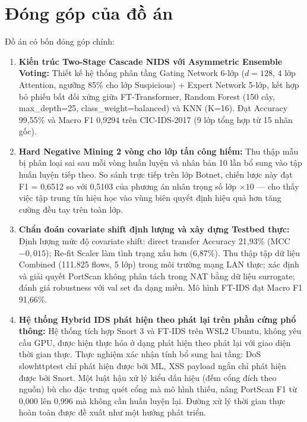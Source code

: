 \documentclass[../DoAn.tex]{subfiles}
\begin{document}
\section{Đóng góp của đồ án}
\label{sec:dg}

Đồ án có bốn đóng góp chính:

\begin{enumerate}
    \item \textbf{Kiến trúc Two-Stage Cascade NIDS với Asymmetric Ensemble Voting:} Thiết kế hệ thống phân tầng Gating Network 6-lớp ($d=128$, 4 lớp Attention, ngưỡng 85\% cho lớp Suspicious) + Expert Network 5-lớp, kết hợp bỏ phiếu bất đối xứng giữa FT-Transformer, Random Forest (150 cây, max\_depth=25, class\_weight=balanced) và KNN (K=16). Đạt Accuracy 99,55\% và Macro F1 0,9294 trên CIC-IDS-2017 (9 lớp tổng hợp từ 15 nhãn gốc).

    \item \textbf{Hard Negative Mining 2 vòng cho lớp tấn công hiếm:} Thu thập mẫu bị phân loại sai sau mỗi vòng huấn luyện và nhân bản 10 lần bổ sung vào tập huấn luyện tiếp theo. So sánh trực tiếp trên lớp Botnet, chiến lược này đạt F1 = 0,6512 so với 0,5103 của phương án nhân trọng số lớp $\times 10$ --- cho thấy việc tập trung tín hiệu học vào vùng biên quyết định hiệu quả hơn tăng cường đều tay trên toàn lớp.

    \item \textbf{Chẩn đoán covariate shift định lượng và xây dựng Testbed thực:} Định lượng mức độ covariate shift: direct transfer Accuracy 21,93\% (MCC $-0{,}015$); Re-fit Scaler làm tình trạng xấu hơn (6,87\%). Thu thập tập dữ liệu Combined (111.825 flows, 5 lớp) trong môi trường mạng LAN thực; xác định và giải quyết PortScan không phân tách trong NAT bằng dữ liệu surrogate; đánh giá robustness với val set đa dạng miền. Mô hình FT-IDS đạt Macro F1 91,66\%.

    \item \textbf{Hệ thống Hybrid IDS phát hiện theo phát lại trên phần cứng phổ thông:} Hệ thống tích hợp Snort 3 và FT-IDS trên WSL2 Ubuntu, không yêu cầu GPU, được hiện thực hóa ở dạng phát hiện theo phát lại với giao diện thời gian thực. Thực nghiệm xác nhận tính bổ sung hai tầng: DoS slowhttptest chỉ phát hiện được bởi ML, XSS payload ngắn chỉ phát hiện được bởi Snort. Một luật hậu xử lý kiểu dấu hiệu (đếm cổng đích theo nguồn) bù cho đặc trưng quét cổng mà mô hình thiếu, nâng PortScan F1 từ 0,000 lên 0,996 mà không cần huấn luyện lại. Đường xử lý thời gian thực hoàn toàn được đề xuất như một hướng phát triển.
\end{enumerate}
\end{document}
